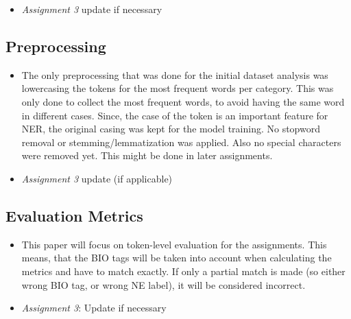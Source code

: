 \documentclass[11pt]{article}
\begin{document}
\begin{itemize}
          In \ref{fig:most_common_words_per_label_no_IOB}, the most common words for location, persons, organizations and miscellaneous names are shown.
          Here the IOB tags have been removed for clarity.
          For location, "u.s" is most common, "cup" is most common for miscellaneous names,"clinton" for persons and "of" for organizations.

    \item[] \textit{Assignment 3} update if necessary
\end{itemize}



\subsection{Preprocessing}

\begin{itemize}
    \item[] The only preprocessing that was done for the initial dataset analysis was lowercasing the tokens for the most frequent words per category.
          This was only done to collect the most frequent words, to avoid having the same word in different cases.
          Since, the case of the token is an important feature for NER, the original casing was kept for the model training.
          No stopword removal or stemming/lemmatization was applied. Also no special characters were removed yet.
          This might be done in later assignments.

    \item[] \textit{Assignment 3} update (if applicable)
\end{itemize}



\subsection{Evaluation Metrics}

\begin{itemize}
    \item[]
          This paper will focus on token-level evaluation for the assignments.
          This means, that the BIO tags will be taken into account when calculating the metrics and have to match exactly.
          If only a partial match is made (so either wrong BIO tag, or wrong NE label), it will be considered incorrect.
    \item[] \textit{Assignment 3}: Update if necessary
\end{itemize}
\end{document}
